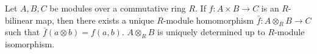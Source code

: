 Let $A, B, C$ be modules over a commutative ring $R$. If $f: A \times B \to C$ is an $R$-bilinear map, then there exists a unique $R$-module homomorphism $\bar{f}: A \otimes_R B \to C$ such that $\bar{f}(a \otimes b) = f(a,b)$. $A \otimes_R B$ is uniquely determined up to $R$-module isomorphism.
